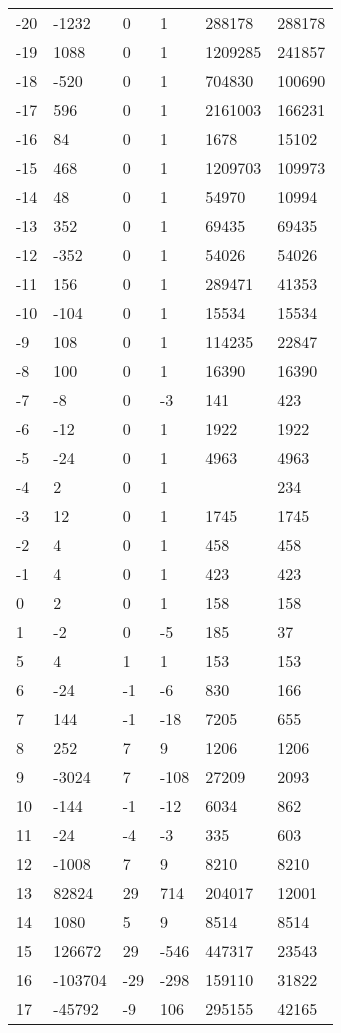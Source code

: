 \documentclass{amsart}
\begin{document}
\begin{longtable}{llllll}
-20 & -1232 & 0 & 1 & 288178 & 288178\\
-19 & 1088 & 0 & 1 & 1209285 & 241857\\
-18 & -520 & 0 & 1 & 704830 & 100690\\
-17 & 596 & 0 & 1 & 2161003 & 166231\\
-16 & 84 & 0 & 1 & 1678 & 15102\\
-15 & 468 & 0 & 1 & 1209703 & 109973\\
-14 & 48 & 0 & 1 & 54970 & 10994\\
-13 & 352 & 0 & 1 & 69435 & 69435\\
-12 & -352 & 0 & 1 & 54026 & 54026\\
-11 & 156 & 0 & 1 & 289471 & 41353\\
-10 & -104 & 0 & 1 & 15534 & 15534\\
-9 & 108 & 0 & 1 & 114235 & 22847\\
-8 & 100 & 0 & 1 & 16390 & 16390\\
-7 & -8 & 0 & -3 & 141 & 423\\
-6 & -12 & 0 & 1 & 1922 & 1922\\
-5 & -24 & 0 & 1 & 4963 & 4963\\
-4 & 2 & 0 & 1 &  & 234\\
-3 & 12 & 0 & 1 & 1745 & 1745\\
-2 & 4 & 0 & 1 & 458 & 458\\
-1 & 4 & 0 & 1 & 423 & 423\\
0 & 2 & 0 & 1 & 158 & 158\\
1 & -2 & 0 & -5 & 185 & 37\\
5 & 4 & 1 & 1 & 153 & 153\\
6 & -24 & -1 & -6 & 830 & 166\\
7 & 144 & -1 & -18 & 7205 & 655\\
8 & 252 & 7 & 9 & 1206 & 1206\\
9 & -3024 & 7 & -108 & 27209 & 2093\\
10 & -144 & -1 & -12 & 6034 & 862\\
11 & -24 & -4 & -3 & 335 & 603\\
12 & -1008 & 7 & 9 & 8210 & 8210\\
13 & 82824 & 29 & 714 & 204017 & 12001\\
14 & 1080 & 5 & 9 & 8514 & 8514\\
15 & 126672 & 29 & -546 & 447317 & 23543\\
16 & -103704 & -29 & -298 & 159110 & 31822\\
17 & -45792 & -9 & 106 & 295155 & 42165\\

\end{longtable}
\end{document}
